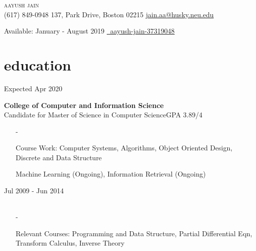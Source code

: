 \documentclass[a4paper, 10pt, oneside]{article}
\begin{document}

\begin{center}
\color{headings}\textsc{\Huge{{aayush jain}}} \\
\vspace{0.0em}
\color{text1}{\Large\Telefon} (617) 849-0948 \hfill \hspace{3.3em}137, Park Drive, Boston 02215 \hfill {\Large\Letter} \href{mailto:jain.aa@husky.neu.edu.com}{jain.aa@husky.neu.edu} 

\vspace{-0.0em}
\hfill \hspace{3em} {\selectfont Available: January - August 2019}  
 \hspace{7.8em} {\Large\faLinkedin} \href{https://www.linkedin.com/in/aayush-jain-37319048/}{\ aayush-jain-37319048}

\vspace{-1em}
\section{\color{headings}education}
\vspace{-0.5em}
 \hfill {Expected Apr 2020}\\
\raggedright \textbf{College of Computer and Information Science}\\
Candidate for Master of Science in Computer Science\hfill {GPA 3.89/4}\\
\begin{itemize}
\vspace{-0.7em}
\item[-]\raggedright{Course Work:} Computer Systems, Algorithms, Object Oriented Design, Discrete and Data Structure
\vspace{-0.7em}
\item[] Machine Learning (Ongoing), Information Retrieval (Ongoing) \\
\end{itemize}

 \hfill {Jul 2009 - Jun 2014}\\
\color{text1}{Bachelors (Honors) \& Masters (Honors) of Science in Exploration Geophysics} \hfill\\%
\begin{itemize}
\vspace{-0.7em}
\item[-] \raggedright{Relevant Courses:} Programming and Data Structure, Partial Differential Eqn, Transform Calculus, Inverse Theory\\
\vspace{-0.7 em}
\end{itemize}
\end{center}
\end{document}
